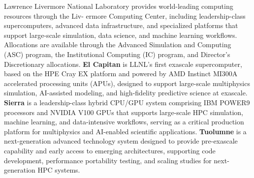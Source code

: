 
Lawrence Livermore National Laboratory provides world-leading computing resources through the Liv-
ermore Computing Center, including leadership-class supercomputers, advanced data infrastructure, and
specialized platforms that support large-scale simulation, data science, and machine learning workflows.
Allocations are available through the Advanced Simulation and Computing (ASC) program, the Institutional
Computing (IC) program, and Director’s Discretionary allocations.
%
{\bf El Capitan} is LLNL’s first exascale supercomputer, based on the HPE Cray EX platform and powered by
AMD Instinct MI300A accelerated processing units (APUs), designed to support large-scale multiphysics
simulation, AI-assisted modeling, and high-fidelity predictive science at exascale.
%
{\bf Sierra} is a leadership-class hybrid CPU/GPU system comprising IBM POWER9 processors and NVIDIA
V100 GPUs that supports large-scale HPC simulation, machine learning, and data-intensive workflows,
serving as a critical production platform for multiphysics and AI-enabled scientific applications.
%
{\bf Tuolumne} is a next-generation advanced technology system designed to provide pre-exascale capability
and early access to emerging architectures, supporting code development, performance portability testing,
and scaling studies for next-generation HPC systems.

